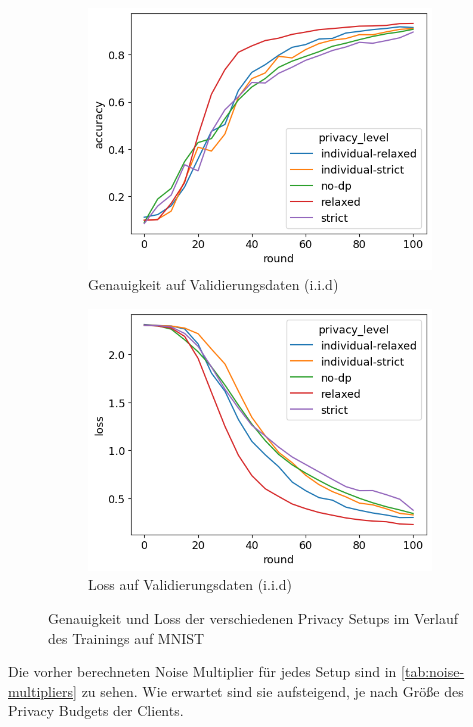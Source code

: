 \begin{figure}[h]
\begin{subfigure}{0.45\textwidth}
		\includegraphics[width=\textwidth]{Bilder/emnist-accuracy-iid.png}
		\caption{Genauigkeit auf Validierungsdaten (i.i.d)}
	\end{subfigure}
	\begin{subfigure}{0.45\textwidth}
		\centering
		\includegraphics[width=\textwidth]{Bilder/emnist-loss-iid.png}
		\caption{Loss auf Validierungsdaten (i.i.d)}
	\end{subfigure}
	\caption{Genauigkeit und Loss der verschiedenen Privacy Setups im Verlauf des Trainings auf MNIST}
	\label{fig:fed-emnist-results}
\end{figure}

Die vorher berechneten Noise Multiplier für jedes Setup sind in \autoref{tab:noise-multipliers} zu sehen. Wie erwartet sind sie aufsteigend, je nach Größe des Privacy Budgets der Clients.

